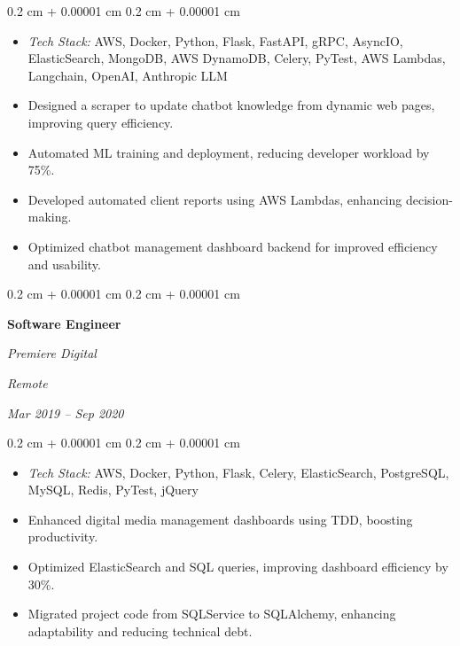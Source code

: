 \documentclass[10pt, letterpaper]{article}
\newenvironment{highlights}{
        \begin{itemize}[
            topsep=0.10 cm,
            parsep=0.10 cm,
            partopsep=0pt,
            itemsep=0pt,
            leftmargin=0.4 cm + 10pt
        ]
    }{
        \end{itemize}
    } %
\newenvironment{onecolentry}{
        \begin{adjustwidth}{
            0.2 cm + 0.00001 cm
        }{
            0.2 cm + 0.00001 cm
        }
    }{
        \end{adjustwidth}
    } %
\newenvironment{twocolentry}[2][]{
        \onecolentry
        \def\secondColumn{#2}
        \setcolumnwidth{\fill, 4.5 cm}
        \begin{paracol}{2}
    }{
        \switchcolumn \raggedleft \secondColumn
        \end{paracol}
        \endonecolentry
    } %
\begin{document}
        \vspace{0.10 cm}
        \begin{onecolentry}
            \begin{highlights}
                \item \textit{Tech Stack:} AWS, Docker, Python, Flask, FastAPI, gRPC, AsyncIO, ElasticSearch, MongoDB, AWS DynamoDB, Celery, PyTest, AWS Lambdas, Langchain, OpenAI, Anthropic LLM
                \item Designed a scraper to update chatbot knowledge from dynamic web pages, improving query efficiency.
                \item Automated ML training and deployment, reducing developer workload by 75\%.
                \item Developed automated client reports using AWS Lambdas, enhancing decision-making.
                \item Optimized chatbot management dashboard backend for improved efficiency and usability.
            \end{highlights}
        \end{onecolentry}

        \pagebreak

        \begin{twocolentry}{
        \textit{Remote}    
            
        \textit{Mar 2019 – Sep 2020}}
            \textbf{Software Engineer}
            
            \textit{Premiere Digital}
        \end{twocolentry}

        \vspace{0.10 cm}
        \begin{onecolentry}
            \begin{highlights}
                \item \textit{Tech Stack:} AWS, Docker, Python, Flask, Celery, ElasticSearch, PostgreSQL, MySQL, Redis, PyTest, jQuery
                \item Enhanced digital media management dashboards using TDD, boosting productivity.
                \item Optimized ElasticSearch and SQL queries, improving dashboard efficiency by 30\%.
                \item Migrated project code from SQLService to SQLAlchemy, enhancing adaptability and reducing technical debt.
            \end{highlights}
        \end{onecolentry}
\end{document}
